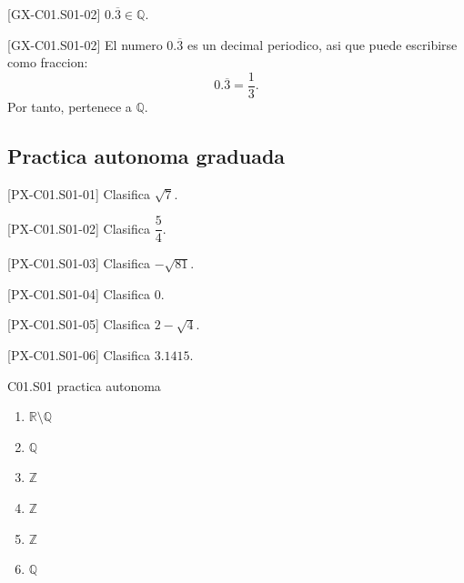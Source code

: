 \begin{shortanswer}{[GX-C01.S01-02]}
\(0.\overline{3}\in\mathbb{Q}\).
\end{shortanswer}

\begin{fullsolution}{[GX-C01.S01-02]}
El numero \(0.\overline{3}\) es un decimal periodico, asi que puede escribirse como fraccion:
\[
0.\overline{3}=\frac{1}{3}.
\]
Por tanto, pertenece a \(\mathbb{Q}\).
\end{fullsolution}

\subsection*{Practica autonoma graduada}
\begin{exercise}{[PX-C01.S01-01] Clasifica \(\sqrt{7}\).}
\end{exercise}
\begin{exercise}{[PX-C01.S01-02] Clasifica \(\dfrac{5}{4}\).}
\end{exercise}
\begin{exercise}{[PX-C01.S01-03] Clasifica \(-\sqrt{81}\).}
\end{exercise}
\begin{exercise}{[PX-C01.S01-04] Clasifica \(0\).}
\end{exercise}
\begin{exercise}{[PX-C01.S01-05] Clasifica \(2-\sqrt{4}\).}
\end{exercise}
\begin{exercise}{[PX-C01.S01-06] Clasifica \(3.1415\).}
\end{exercise}

\begin{shortanswer}{C01.S01 practica autonoma}
\begin{enumerate}[label=\textbf{PX-C01.S01-\arabic*:}, leftmargin=*]
  \item \(\mathbb{R}\setminus\mathbb{Q}\)
  \item \(\mathbb{Q}\)
  \item \(\mathbb{Z}\)
  \item \(\mathbb{Z}\)
  \item \(\mathbb{Z}\)
  \item \(\mathbb{Q}\)
\end{enumerate}
\end{shortanswer}

